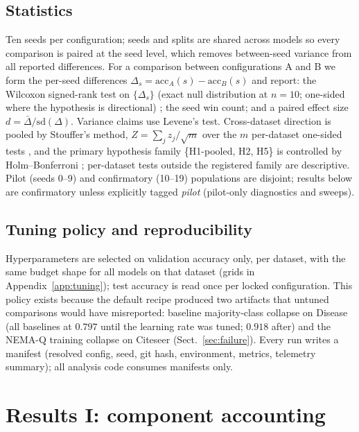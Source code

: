 \documentclass[pdflatex,sn-mathphys-num]{sn-jnl}
\begin{document}
\subsection{Statistics}\label{sec:stats}

Ten seeds per configuration; seeds and splits are shared across models so every comparison is paired at the seed level, which removes between-seed variance from all reported differences. For a comparison between configurations A and B we form the per-seed differences $\Delta_s = \mathrm{acc}_A(s) - \mathrm{acc}_B(s)$ and report: the Wilcoxon signed-rank test on $\{\Delta_s\}$ (exact null distribution at $n=10$; one-sided where the hypothesis is directional) \cite{wilcoxon1945,demsar2006}; the seed win count; and a paired effect size $d = \bar{\Delta}/\mathrm{sd}(\Delta)$. Variance claims use Levene's test. Cross-dataset direction is pooled by Stouffer's method, $Z = \sum_j z_j / \sqrt{m}$ over the $m$ per-dataset one-sided tests \cite{stouffer1949}, and the primary hypothesis family \{H1-pooled, H2, H5\} is controlled by Holm--Bonferroni \cite{holm1979}; per-dataset tests outside the registered family are descriptive. Pilot (seeds 0--9) and confirmatory (10--19) populations are disjoint; results below are confirmatory unless explicitly tagged \emph{pilot} (pilot-only diagnostics and sweeps).

\subsection{Tuning policy and reproducibility}\label{sec:tuning}

Hyperparameters are selected on validation accuracy only, per dataset, with the same budget shape for all models on that dataset (grids in Appendix~\ref{app:tuning}); test accuracy is read once per locked configuration. This policy exists because the default recipe produced two artifacts that untuned comparisons would have misreported: baseline majority-class collapse on Disease (all baselines at $0.797$ until the learning rate was tuned; $0.918$ after) and the NEMA-Q training collapse on Citeseer (Sect.~\ref{sec:failure}). Every run writes a manifest (resolved config, seed, git hash, environment, metrics, telemetry summary); all analysis code consumes manifests only.

\section{Results I: component accounting}\label{sec:accounting}
\end{document}
